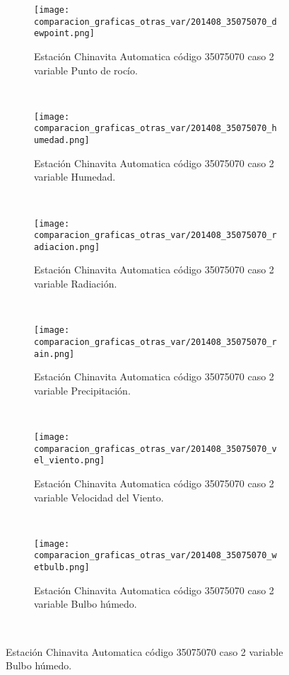 \begin{figure}[H]
\centering
\begin{subfigure}[normla]{0.4\textwidth}
\caption{Estación Chinavita Automatica código 35075070 caso 2 variable Punto de rocío.}
\texttt{[image: comparacion\_graficas\_otras\_var/201408\_35075070\_dewpoint.png]}
\end{subfigure}
~
\begin{subfigure}[normla]{0.4\textwidth}
\caption{Estación Chinavita Automatica código 35075070 caso 2 variable Humedad.}
\texttt{[image: comparacion\_graficas\_otras\_var/201408\_35075070\_humedad.png]}
\end{subfigure}
~
\begin{subfigure}[normla]{0.4\textwidth}
\caption{Estación Chinavita Automatica código 35075070 caso 2 variable Radiación.}
\texttt{[image: comparacion\_graficas\_otras\_var/201408\_35075070\_radiacion.png]}
\end{subfigure}
~
\begin{subfigure}[normla]{0.4\textwidth}
\caption{Estación Chinavita Automatica código 35075070 caso 2 variable Precipitación.}
\texttt{[image: comparacion\_graficas\_otras\_var/201408\_35075070\_rain.png]}
\end{subfigure}
~
\begin{subfigure}[normla]{0.4\textwidth}
\caption{Estación Chinavita Automatica código 35075070 caso 2 variable Velocidad del Viento.}
\texttt{[image: comparacion\_graficas\_otras\_var/201408\_35075070\_vel\_viento.png]}
\end{subfigure}
~
\begin{subfigure}[normla]{0.4\textwidth}
\caption{Estación Chinavita Automatica código 35075070 caso 2 variable Bulbo húmedo.}
\texttt{[image: comparacion\_graficas\_otras\_var/201408\_35075070\_wetbulb.png]}
\end{subfigure}
~
\end{figure}
           
